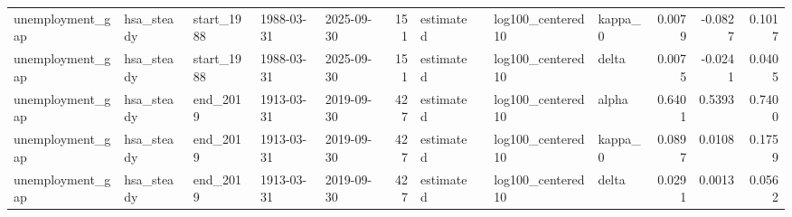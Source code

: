 \begin{tabular}{lllllrllllrrr}
unemployment\_gap & hsa\_steady & start\_1988 & 1988-03-31 & 2025-09-30 & 151 & estimated &  & log100\_centered10 & kappa\_0 & 0.0079 & -0.0827 & 0.1017 \\
unemployment\_gap & hsa\_steady & start\_1988 & 1988-03-31 & 2025-09-30 & 151 & estimated &  & log100\_centered10 & delta & 0.0075 & -0.0241 & 0.0405 \\
unemployment\_gap & hsa\_steady & end\_2019 & 1913-03-31 & 2019-09-30 & 427 & estimated &  & log100\_centered10 & alpha & 0.6401 & 0.5393 & 0.7400 \\
unemployment\_gap & hsa\_steady & end\_2019 & 1913-03-31 & 2019-09-30 & 427 & estimated &  & log100\_centered10 & kappa\_0 & 0.0897 & 0.0108 & 0.1759 \\
unemployment\_gap & hsa\_steady & end\_2019 & 1913-03-31 & 2019-09-30 & 427 & estimated &  & log100\_centered10 & delta & 0.0291 & 0.0013 & 0.0562 \\
\bottomrule
\end{tabular}
